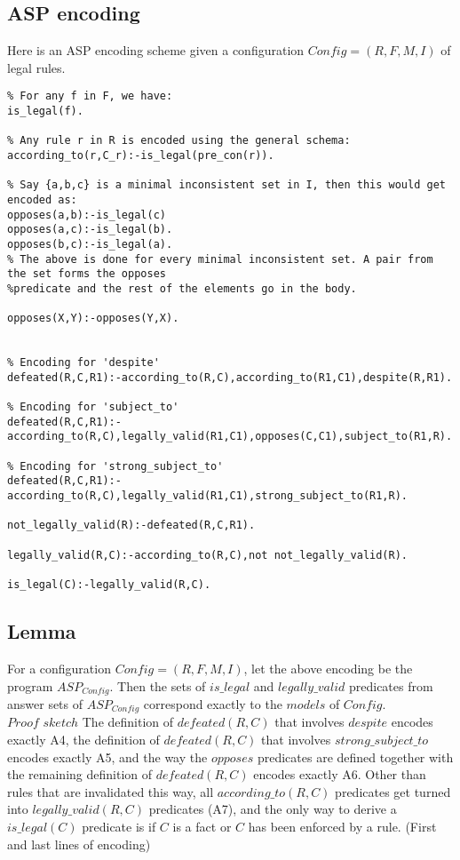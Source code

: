 \subsection{ASP encoding}
Here is an ASP encoding scheme given a configuration $Config = (R,F,M,I)$ of legal rules.
\begin{verbatim}
% For any f in F, we have:
is_legal(f).    

% Any rule r in R is encoded using the general schema:
according_to(r,C_r):-is_legal(pre_con(r)).

% Say {a,b,c} is a minimal inconsistent set in I, then this would get encoded as: 
opposes(a,b):-is_legal(c)
opposes(a,c):-is_legal(b).
opposes(b,c):-is_legal(a).
% The above is done for every minimal inconsistent set. A pair from the set forms the opposes
%predicate and the rest of the elements go in the body.

opposes(X,Y):-opposes(Y,X).


% Encoding for 'despite'
defeated(R,C,R1):-according_to(R,C),according_to(R1,C1),despite(R,R1).

% Encoding for 'subject_to'
defeated(R,C,R1):-according_to(R,C),legally_valid(R1,C1),opposes(C,C1),subject_to(R1,R).

% Encoding for 'strong_subject_to'
defeated(R,C,R1):-according_to(R,C),legally_valid(R1,C1),strong_subject_to(R1,R).

not_legally_valid(R):-defeated(R,C,R1).

legally_valid(R,C):-according_to(R,C),not not_legally_valid(R).

is_legal(C):-legally_valid(R,C).
\end{verbatim}
\subsection{Lemma}
For a configuration $Config=(R,F,M,I)$, let the above encoding be the program $ASP_{Config}$. Then the sets of $is\_legal$ and $legally\_valid$ predicates from answer sets of $ASP_{Config}$ correspond exactly to the $models$ of $Config$.\\
\newline
$Proof$ $sketch$ The definition of $defeated(R,C)$ that involves $despite$ encodes exactly A4, the definition of $defeated(R,C)$ that involves $strong\_subject\_to$ encodes exactly A5, and the way the $opposes$ predicates are defined together with the remaining definition of $defeated(R,C)$ encodes exactly A6. Other than rules that are invalidated this way, all $according\_to(R,C)$ predicates get turned into $legally\_valid(R,C)$ predicates (A7), and the only way to derive a $is\_legal(C)$ predicate is if $C$ is a fact or $C$ has been enforced by a rule. (First and last lines of encoding)
